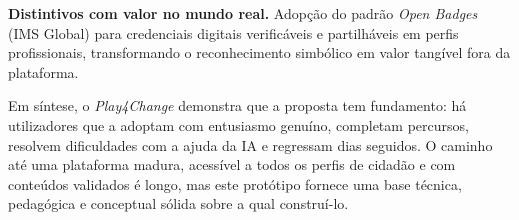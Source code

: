 \textbf{Distintivos com valor no mundo real.} Adopção do padrão \emph{Open Badges} (IMS Global) para credenciais digitais verificáveis e partilháveis em perfis profissionais, transformando o reconhecimento simbólico em valor tangível fora da plataforma.

\enlargethispage{2\baselineskip}
Em síntese, o \emph{Play4Change} demonstra que a proposta tem fundamento: há utilizadores que a adoptam com entusiasmo genuíno, completam percursos, resolvem dificuldades com a ajuda da IA e regressam dias seguidos. O caminho até uma plataforma madura, acessível a todos os perfis de cidadão e com conteúdos validados é longo, mas este protótipo fornece uma base técnica, pedagógica e conceptual sólida sobre a qual construí-lo.
